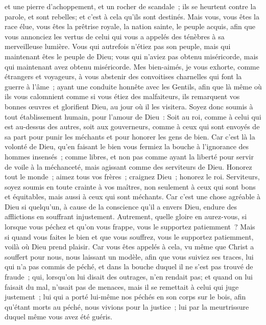 \begin{multicols}{2}
et une pierre d'achoppement, et un rocher de scandale~; ils se heurtent contre la parole, et sont rebelles; et c'est à cela qu'ils sont destinés.
Mais vous, vous êtes la race élue, vous êtes la prêtrise royale, la nation sainte, le peuple acquis, afin que vous annonciez les vertus de celui qui vous a appelés des ténèbres à sa merveilleuse lumière.
Vous qui autrefois n'étiez pas son peuple, mais qui maintenant êtes le peuple de Dieu; vous qui n'aviez pas obtenu miséricorde, mais qui maintenant avez obtenu miséricorde.
Mes bien-aimés, je vous exhorte, comme étrangers et voyageurs, à vous abstenir des convoitises charnelles qui font la guerre à l'âme~;
ayant une conduite honnête avec les Gentils, afin que là même où ils vous calomnient comme si vous étiez des malfaiteurs, ils remarquent vos bonnes œuvres et glorifient Dieu, au jour où il les visitera.
Soyez donc soumis à tout établissement humain, pour l'amour de Dieu~: Soit au roi, comme à celui qui est au-dessus des autres,
soit aux gouverneurs, comme à ceux qui sont envoyés de sa part pour punir les méchants et pour honorer les gens de bien.
Car c'est là la volonté de Dieu, qu'en faisant le bien vous fermiez la bouche à l'ignorance des hommes insensés~;
comme libres, et non pas comme ayant la liberté pour servir de voile à la méchanceté, mais agissant comme des serviteurs de Dieu.
Honorez tout le monde~; aimez tous vos frères~; craignez Dieu~; honorez le roi.
Serviteurs, soyez soumis en toute crainte à vos maîtres, non seulement à ceux qui sont bons et équitables, mais aussi à ceux qui sont méchants.
Car c'est une chose agréable à Dieu si quelqu'un, à cause de la conscience qu'il a envers Dieu, endure des afflictions en souffrant injustement. 
Autrement, quelle gloire en aurez-vous, si lorsque vous péchez et qu'on vous frappe, vous le supportez patiemment~? Mais si quand vous faites le bien et que vous souffrez, vous le supportez patiemment, voilà où Dieu prend plaisir. 
Car vous êtes appelés à cela, vu même que Christ a souffert pour nous, nous laissant un modèle, afin que vous suiviez ses traces, 
lui qui n'a pas commis de péché, et dans la bouche duquel il ne s'est pas trouvé de fraude~;
qui, lorsqu'on lui disait des outrages, n'en rendait pas; et quand on lui faisait du mal, n'usait pas de menaces, mais il se remettait à celui qui juge justement~; 
lui qui a porté lui-même nos péchés en son corps sur le bois, afin qu'étant morts au péché, nous vivions pour la justice~; lui par la meurtrissure duquel même vous avez été guéris.

\end{multicols}
